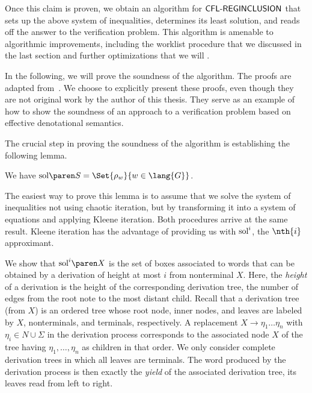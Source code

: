 \documentclass[../../diss.tex]{subfiles}
\begin{document}
Once this claim is proven, we obtain an algorithm for $\mathsf{CFL\text{-}REGINCLUSION}$ that sets up the above system of inequalities, determines its least solution, and reads off the answer to the verification problem.
This algorithm is amenable to algorithmic improvements, including the worklist procedure that we discussed in the last section and further optimizations that we will .

In the following, we will prove the soundness of the algorithm.
The proofs are adapted from~\cite{HolikM15}.
We choose to explicitly present these proofs, even though they are not original work by the author of this thesis.
They serve as an example of how to show the soundness of an approach to a verification problem based on effective denotational semantics.


The crucial step in proving the soundness of the algorithm is establishing the following lemma.

\begin{lemma}%
\label{Lemma:EDSRegInclSoundness}%
    We have $\sol{S} = \Set{ \tbox{w} }{ w \in \lang{G}}$.
\end{lemma}

The easiest way to prove this lemma is to assume that we solve the system of inequalities not using chaotic iteration, but by transforming it into a system of equations and applying Kleene iteration.
Both procedures arrive at the same result.
Kleene iteration has the advantage of providing us with $\text{sol}^{i}$, the $\nth{i}$ approximant.

We show that $\sol{i}{X}$ is the set of boxes associated to words that can be obtained by a derivation of height at most $i$ from nonterminal $X$.
Here, the \emph{height} of a derivation is the height of the corresponding derivation tree, \ie the number of edges from the root note to the most distant child.
Recall that a derivation tree (from $X$) is an ordered tree whose root node, inner nodes, and leaves are labeled by $X$, nonterminals, and terminals, respectively.
A replacement $X \to \eta_1 \ldots \eta_n$ with $\eta_i \in N \cup \Sigma$ in the derivation process corresponds to the associated node $X$ of the tree having $\eta_1, \ldots, \eta_n$ as children in that order.
We only consider complete derivation trees in which all leaves are terminals.
The word produced by the derivation process is then exactly the \emph{yield} of the associated derivation tree, \ie its leaves read from left to right.
\end{document}
